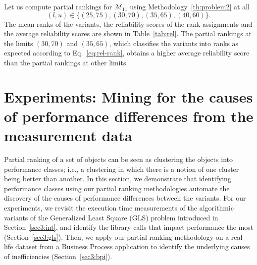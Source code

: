 \documentclass[acmsmall,screen, review]{acmart}
\begin{document}
Let us compute partial rankings for $\mathcal{M}_{11}$ using Methodology~\ref{th:problem2} at all
\begin{equation}
\label{eq:qlist}
(l, u) \in  \{ (25,75), (30,70), (35,65), (40,60) \}.
\end{equation}
The mean ranks of the variants, the reliability scores of the rank assignments and the average reliability scores are shown in Table~\ref{tab:rel}.   The partial rankings at the limits $(30,70)$ and $(35, 65)$, which classifies the variants into ranks as expected according to Eq.~\ref{eq:rel-rank}, obtains a higher average reliability score than the partial rankings at other limits. 


\section{Experiments: Mining for the causes of performance differences from the measurement data}  
\label{sec3:exp}

Partial ranking of a set of objects can be seen as clustering the objects into performance classes; i.e., a clustering in which there is a notion of one cluster being better than another.
 In this section, we demonstrate that identifying performance classes using our partial ranking methodologies automate the discovery of the causes of performance differences between the variants. For our experiments, we revisit the execution time measurements of the algorithmic variants of the Generalized Least Square (GLS) problem introduced in Section~\ref{sec3:int}, and identify the library calls that impact performance the most (Section~\ref{sec3:gls}). Then,  we apply our partial ranking methodology on a real-life dataset from a Business Process application to identify the underlying causes of inefficiencies (Section~\ref{sec3:bpi}).

\end{document}
